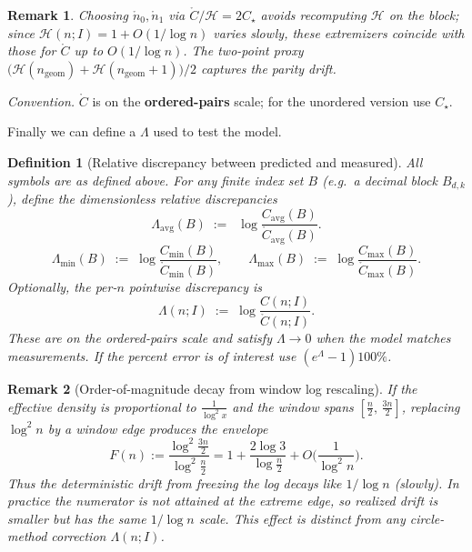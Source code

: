 \documentclass[11pt]{article}
\theoremstyle{inline}
\newtheorem*{remark}{Remark}
\theoremstyle{break}
\theoremstyle{break}
\theoremstyle{break}
\theoremstyle{break}
\theoremstyle{break}
\newtheorem{definition}{Definition}
\theoremstyle{inline}
\newcommand{\tavg}{{\scriptscriptstyle\mathrm{avg}}}
\newcommand{\Cmeas}{C}              %
\newcommand{\Cpred}{\mathring{C}}   %
\newcommand{\Npred}{\mathring{n}}   %
\newcommand{\Ngeom}{n_\mathrm{geom}}
\newcommand{\HLCorr}{\mathcal{H}}
\begin{document}
\begin{remark}
Choosing \(\Npred_0,\Npred_1\) via \(\Cpred/\HLCorr = 2C_\star\) avoids recomputing \(\HLCorr\) on the block; since
\(\HLCorr(n;I)=1+O(1/\log n)\) varies slowly, these extremizers coincide with those for \(\Cpred\) up to \(O(1/\log n)\).
The two-point proxy \(\big(\HLCorr(\Ngeom)+\HLCorr(\Ngeom+1)\big)/2\) captures the parity drift.
\end{remark}

\noindent\emph{Convention.} \(\Cpred\) is on the \textbf{ordered-pairs} scale; for the unordered version use \(C_\star\).

Finally we can define a \( \Lambda \) used to test the model.

\begin{definition}[Relative discrepancy between predicted and measured]
\label{def:lambda}
All symbols are as defined above. For any finite index set \(B\) (e.g.\ a decimal block \(B_{d,k}\)),
define the dimensionless relative discrepancies
\begin{equation}
\Lambda_{\tavg}(B)\;:=\;\;\log{\frac{\Cmeas_{\tavg}(B)}{\Cpred_{\tavg}(B)}}.
\end{equation}
\begin{equation}
\Lambda_{\min}(B)\;:=\;\log{\frac{\Cmeas_{\min}(B)}{\Cpred_{\min}(B)}},
\qquad
\Lambda_{\max}(B)\;:=\;\log{\frac{\Cmeas_{\max}(B)}{\Cpred_{\max}(B)}}.
\end{equation}
Optionally, the per-\(n\) pointwise discrepancy is
\begin{equation}
\Lambda(n;I)\;:=\;\log{\frac{\Cmeas(n;I)}{\Cpred(n;I)}}.
\end{equation}
These are on the ordered-pairs scale and satisfy \(\Lambda\to 0\) when the model matches measurements.
If the percent error is of interest use \( \left( e^{\Lambda} - 1 \right) 100\% \).
\end{definition}

\begin{remark}[Order-of-magnitude decay from window log rescaling]
If the effective density is proportional to \(\frac{1}{\log^2{x}}\) and the window spans
\(\left[\frac{n}{2},\,\frac{3n}{2}\right]\), replacing \(\log^2 n\) by a window edge produces the envelope
\begin{equation}
F(n):=\frac{\log^2{\frac{3n}{2}}}{\log^2{\frac{n}{2}}}
=1+\frac{2\log 3}{\log{\frac{n}{2}}}+O\!\Big(\frac{1}{\log^2 n}\Big).
\end{equation}
Thus the deterministic drift from freezing the log decays like \(1/\log n\) (slowly).
In practice the numerator is not attained at the extreme edge, so realized drift
is smaller but has the same \(1/\log n\) scale. This effect is distinct from any
circle-method correction \(\Lambda(n;I)\).
\end{remark}
\end{document}
